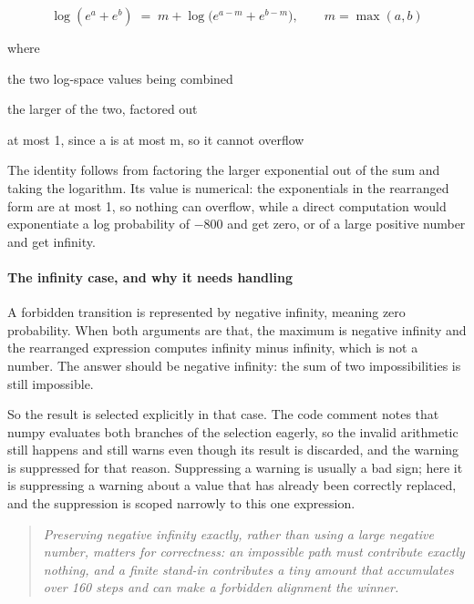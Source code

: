 \begin{equation}
\log(e^a + e^b) \;=\; m + \log\!\big(e^{a-m} + e^{b-m}\big), \qquad m = \max(a,b)
\end{equation}

\noindent where
\begin{description}[leftmargin=2.4em,style=nextline,font=\normalfont\ttfamily]\setlength\itemsep{1pt}
  \item[{$a,\,b$}] \normalfont the two log-space values being combined
  \item[{$m$}] \normalfont the larger of the two, factored out
  \item[{$e^{a-m}$}] \normalfont at most 1, since a is at most m, so it cannot overflow
\end{description}
The identity follows from factoring the larger exponential out of the sum and taking the logarithm. Its value is numerical: the exponentials in the rearranged form are at most 1, so nothing can overflow, while a direct computation would exponentiate a log probability of $-$800 and get zero, or of a large positive number and get infinity.


\paragraph{The infinity case, and why it needs handling}
A forbidden transition is represented by negative infinity, meaning zero probability. When both arguments are that, the maximum is negative infinity and the rearranged expression computes infinity minus infinity, which is not a number. The answer should be negative infinity: the sum of two impossibilities is still impossible.

So the result is selected explicitly in that case. The code comment notes that numpy evaluates both branches of the selection eagerly, so the invalid arithmetic still happens and still warns even though its result is discarded, and the warning is suppressed for that reason. Suppressing a warning is usually a bad sign; here it is suppressing a warning about a value that has already been correctly replaced, and the suppression is scoped narrowly to this one expression.


\begin{quote}\small\itshape Preserving negative infinity exactly, rather than using a large negative number, matters for correctness: an impossible path must contribute exactly nothing, and a finite stand-in contributes a tiny amount that accumulates over 160 steps and can make a forbidden alignment the winner.\end{quote}

